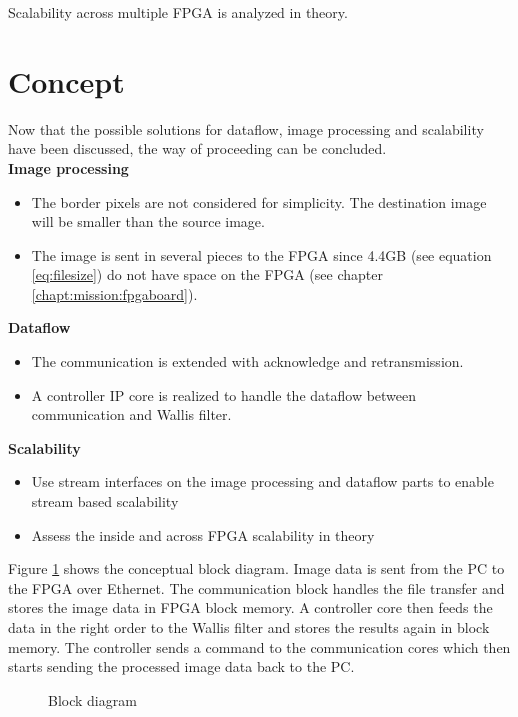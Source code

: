 Scalability across multiple FPGA is analyzed in theory.

%
%
\clearpage
\section{Concept} \label{chapt:mission:concept}
Now that the possible solutions for dataflow, image processing and scalability
have been discussed, the way of proceeding can be concluded.\\


\textbf{Image processing}
    \begin{itemize}
        \item The border pixels are not considered for simplicity. The destination image will be smaller than the source image.
        \item The image is sent in several pieces to the FPGA since 4.4GB 
        (see equation \ref{eq:filesize}) do not have space on the FPGA (see chapter \ref{chapt:mission:fpgaboard}).
    \end{itemize}

\textbf{Dataflow}
    \begin{itemize}
        \item The communication is extended with acknowledge and retransmission.
        \item A controller IP core is realized to handle the dataflow between
        communication and Wallis filter.
    \end{itemize}

\textbf{Scalability}
    \begin{itemize}
        \item Use stream interfaces on the image processing and dataflow parts
        to enable stream based scalability
        \item Assess the inside and across FPGA scalability in theory
    \end{itemize}


Figure \ref{fig:blockdiagram} shows the conceptual block diagram. Image data is
sent from the PC to the FPGA over Ethernet. The communication block handles the
file transfer and stores the image data in FPGA block memory. A controller core
then feeds the data in the right order to the Wallis filter and stores the
results again in block memory. The controller sends a command to the
communication cores which then starts sending the processed image data back to
the PC.

\begin{figure}[b!]
    \centering
    
    \caption{Block diagram}
    \label{fig:blockdiagram}
\end{figure}


